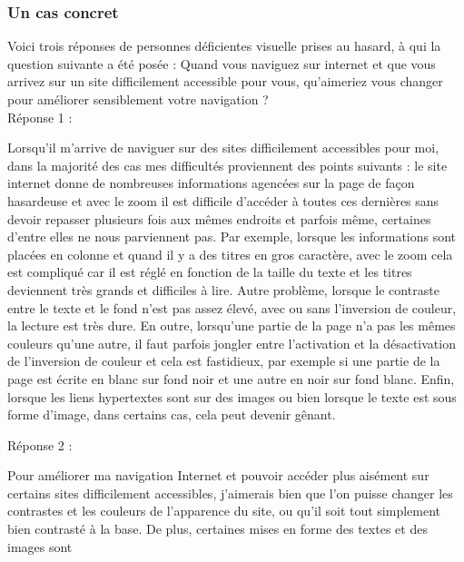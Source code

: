 \documentclass[french,a4paper]{report}
\begin{document}
{\subsubsection{Un cas concret}
Voici trois réponses de personnes déficientes visuelle prises au
hasard, à qui la question suivante a été posée : Quand vous naviguez
sur internet et que vous arrivez sur un site difficilement accessible
pour vous, qu'aimeriez vous changer pour améliorer sensiblement votre
navigation ?
\\
Réponse 1 :
\begin{center}
\colorbox{bck1}{\begin{minipage}{0.9\textwidth} Lorsqu’il m’arrive
de naviguer sur des sites difficilement accessibles pour moi,
dans la majorité des cas mes difficultés proviennent des points
suivants : le site internet donne de nombreuses informations
agencées sur la page de façon hasardeuse et avec le zoom il est
difficile d’accéder à toutes ces dernières sans devoir repasser
plusieurs fois aux mêmes endroits et parfois même, certaines
d’entre elles ne nous parviennent pas. Par exemple, lorsque les
informations sont placées en colonne et quand il y a des
titres en gros caractère, avec le zoom cela est compliqué car
il est réglé en fonction de la taille du texte et les titres
deviennent très grands et difficiles à lire. Autre problème,
lorsque le contraste entre le texte et le fond n’est pas assez
élevé, avec ou sans l’inversion de couleur, la lecture est très
dure. En outre, lorsqu’une partie de la page n’a pas les mêmes
couleurs qu’une autre, il faut parfois jongler entre
l’activation et la désactivation de l’inversion de couleur et
cela est fastidieux, par exemple si une partie de la page est
écrite en blanc sur fond noir et une autre en noir sur fond
blanc. Enfin, lorsque les liens hypertextes sont sur des images
ou bien lorsque le texte est sous forme d’image, dans certains
cas, cela peut devenir gênant.
\end{minipage}}
\end{center}
\vspace{0.6cm}
Réponse 2 :
\begin{center}
\colorbox{bck1}{\begin{minipage}{0.9\textwidth} Pour améliorer ma
navigation Internet et pouvoir accéder plus aisément sur
certains sites difficilement accessibles, j'aimerais bien que
l'on puisse changer les contrastes et les couleurs de
l'apparence du site, ou qu'il soit tout simplement bien
contrasté à la base.
De plus, certaines mises en forme des textes et des images sont

\end{minipage}}
\end{center}}
\end{document}
